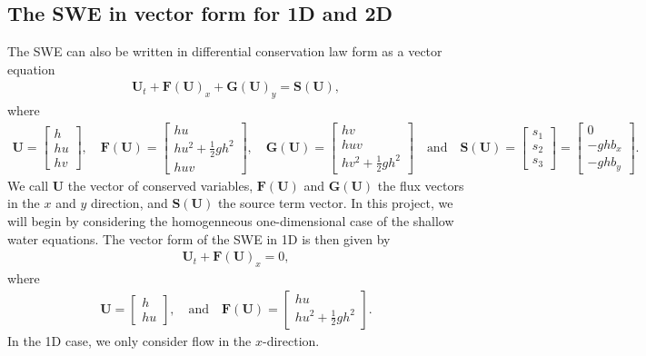 \subsection{The SWE in vector form for 1D and 2D}
The SWE can also be written in differential conservation law form as a vector equation
\begin{align}
    \mathbf{U}_t + \mathbf{F(U)}_x + \mathbf{G(U)}_y = \mathbf{S(U)},
\end{align}
where 
\begin{align*}
    \mathbf{U} = \begin{bmatrix}
        h \\
        hu \\
        hv
    \end{bmatrix},
    \quad 
    \mathbf{F(U)} = \begin{bmatrix}
        hu \\
        hu^2 + \frac{1}{2}gh^2 \\
        huv
    \end{bmatrix},
    \quad
    \mathbf{G(U)} = \begin{bmatrix}
        hv \\
        huv \\
        hv^2 + \frac{1}{2}gh^2
    \end{bmatrix}
    \quad \text{and} \quad
    \mathbf{S(U)} = \begin{bmatrix}
        s_1 \\
        s_2 \\
        s_3
    \end{bmatrix} = 
    \begin{bmatrix}
        0 \\
        -gh b_x \\
        -gh b_y
    \end{bmatrix}
    .
\end{align*}
We call $\mathbf{U}$ the vector of conserved variables, $\mathbf{F(U)}$ and $\mathbf{G(U)}$ the flux vectors in the $x$ and $y$ direction, and $\mathbf{S(U)}$ the source term vector.
In this project, we will begin by considering the homogenneous one-dimensional case of the shallow water equations.
The vector form of the SWE in 1D is then given by
\begin{align*}
    \mathbf{U}_t + {\mathbf{F(U)}}_x = 0,
\end{align*}
where 
\begin{align*}
    \mathbf{U} = \begin{bmatrix}
        h \\
        hu
    \end{bmatrix},
    \quad
    \text{and} \quad
    \mathbf{F(U)} = \begin{bmatrix}
        hu \\
        hu^2 + \frac{1}{2}gh^2
    \end{bmatrix}.
\end{align*}
In the 1D case, we only consider flow in the $x$-direction.

